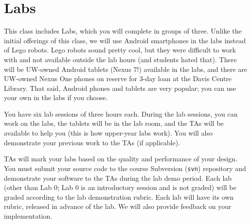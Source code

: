 \documentclass[letterpaper,10pt]{article}
\begin{document}
%


\section*{Labs}
This class includes Labs, which you will complete in groups of three. Unlike the initial offerings of this class, we will use Android smartphones in the labs instead of Lego robots. Lego robots sound pretty cool, but they were difficult to work with and not available outside the lab hours (and students hated that). There will be UW-owned Android tablets (Nexus 7!) available in the labs, and there are UW-owned Nexus One phones on reserve for 3-day loan at the Davis Centre Library. That said, Android phones and tablets are very popular; you can use your own in the labs if you choose.

You have six lab sessions of three hours each. During the lab sessions, you can work on the labs, the tablets will be in the lab room, and the TAs will be available to help you (this is how upper-year labs work). You will also demonstrate your previous work to the TAs (if applicable).

TAs will mark your labs based on the quality and performance of your design. You must submit your source code to the course Subversion (\texttt{svn}) repository and demonstrate your software to the TAs during the lab demo period. Each lab (other than Lab 0; Lab 0 is an introductory session and is not graded) will be graded according to the lab demonstration rubric. Each lab will have its own rubric, released in advance of the lab. We will also provide feedback on your implementation.
\end{document}
